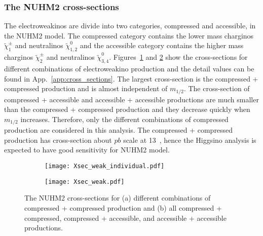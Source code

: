 \subsubsection{The NUHM2 cross-sections}
\label{subsubsed:data_NUHM2_cross_sections}
The electroweakinos are divide into two categories, compressed and accessible, in the NUHM2 model.
The compressed category contains the lower mass charginos $\widetilde{\chi}^{\pm}_{1}$ and neutralinos $\widetilde{\chi}^{0}_{1,2}$ and the accessible category contains the higher mass charginos $\widetilde{\chi}^{\pm}_{2}$ and neutralinos $\widetilde{\chi}^{0}_{3,4}$.
Figures~\ref{fig:data_NUHM2_cross_sections_individual} and \ref{fig:data_NUHM2_cross_sections} show the cross-sections for different combinations of electroweakino production and the detail values can be found in App.~\ref{app:cross_sections}.
The largest cross-section is the compressed + compressed production and is almost independent of $m_{1/2}$.
The cross-section of compressed + accessible and accessible + accessible productions are much smaller than the compressed + compressed production and they decrease quickly when $m_{1/2}$ increases.
Therefore, only the different combinations of compressed production are considered in this analysis.
The compressed + compressed production has cross-section about $pb$ scale at 13~{\TeV}, hence the Higgsino analysis is expected to have good sensitivity for NUHM2 model.

\begin{figure}[htbp]
    \begin{center}
        \begin{subfigure}[b]{0.48\textwidth}
            \begin{center}
                \texttt{[image: Xsec\_weak\_individual.pdf]}
                \caption{}
                \label{fig:data_NUHM2_cross_sections_individual}
            \end{center}
        \end{subfigure}%
        \begin{subfigure}[b]{0.48\textwidth}
            \begin{center}
                \texttt{[image: Xsec\_weak.pdf]}
                \caption{}
                \label{fig:data_NUHM2_cross_sections}
            \end{center}
        \end{subfigure}
    \end{center}
    \caption{The NUHM2 cross-sections for (a) different combinations of compressed + compressed production and (b) all compressed + compressed, compressed + accessible, and accessible + accessible productions.}
    \label{fig:data_NUHM2_cross_sections_individual_and_total}
\end{figure}

